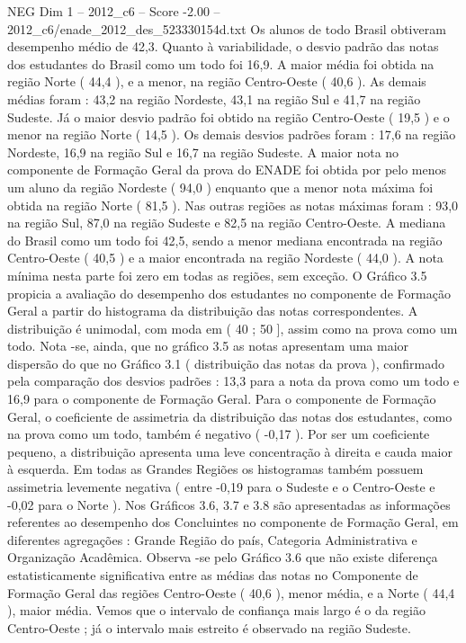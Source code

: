 \begin{textsample}{NEG Dim 1 – 2012\_c6 – Score -2.00 – 2012\_c6/enade\_2012\_des\_523330154d.txt}
Os alunos de todo Brasil obtiveram desempenho médio de 42,3.
Quanto à variabilidade, o desvio padrão das notas dos estudantes do Brasil como um todo foi 16,9.
A maior média foi obtida na região Norte ( 44,4 ), e a menor, na região Centro-Oeste ( 40,6 ).
As demais médias foram : 43,2 na região Nordeste, 43,1 na região Sul e 41,7 na região Sudeste.
Já o maior desvio padrão foi obtido na região Centro-Oeste ( 19,5 ) e o menor na região Norte ( 14,5 ).
Os demais desvios padrões foram : 17,6 na região Nordeste, 16,9 na região Sul e 16,7 na região Sudeste.
A maior nota no componente de Formação Geral da prova do ENADE foi obtida por pelo menos um aluno da região Nordeste ( 94,0 ) enquanto que a menor nota máxima foi obtida na região Norte ( 81,5 ).
Nas outras regiões as notas máximas foram : 93,0 na região Sul, 87,0 na região Sudeste e 82,5 na região Centro-Oeste.
A mediana do Brasil como um todo foi 42,5, sendo a menor mediana encontrada na região Centro-Oeste ( 40,5 ) e a maior encontrada na região Nordeste ( 44,0 ).
A nota mínima nesta parte foi zero em todas as regiões, sem exceção.
O Gráfico 3.5 propicia a avaliação do desempenho dos estudantes no componente de Formação Geral a partir do histograma da distribuição das notas correspondentes.
A distribuição é unimodal, com moda em ( 40 ; 50 ], assim como na prova como um todo.
Nota -se, ainda, que no gráfico 3.5 as notas apresentam uma maior dispersão do que no Gráfico 3.1 ( distribuição das notas da prova ), confirmado pela comparação dos desvios padrões : 13,3 para a nota da prova como um todo e 16,9 para o componente de Formação Geral.
Para o componente de Formação Geral, o coeficiente de assimetria da distribuição das notas dos estudantes, como na prova como um todo, também é negativo ( -0,17 ).
Por ser um coeficiente pequeno, a distribuição apresenta uma leve concentração à direita e cauda maior à esquerda.
Em todas as Grandes Regiões os histogramas também possuem assimetria levemente negativa ( entre -0,19 para o Sudeste e o Centro-Oeste e -0,02 para o Norte ).
Nos Gráficos 3.6, 3.7 e 3.8 são apresentadas as informações referentes ao desempenho dos Concluintes no componente de Formação Geral, em diferentes agregações : Grande Região do país, Categoria Administrativa e Organização Acadêmica.
Observa -se pelo Gráfico 3.6 que não existe diferença estatisticamente significativa entre as médias das notas no Componente de Formação Geral das regiões Centro-Oeste ( 40,6 ), menor média, e a Norte ( 44,4 ), maior média.
Vemos que o intervalo de confiança mais largo é o da região Centro-Oeste ; já o intervalo mais estreito é observado na região Sudeste.

\end{textsample}
